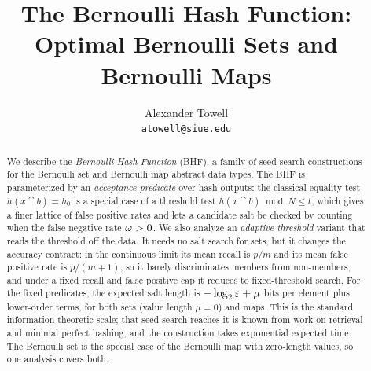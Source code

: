 \documentclass[final,11pt]{article}
\title{The Bernoulli Hash Function:\\Optimal Bernoulli Sets and Bernoulli Maps}
\author{
    Alexander Towell\\
    \texttt{atowell@siue.edu}
}
\date{}
\begin{document}
\maketitle

\begin{abstract}
We describe the \emph{Bernoulli Hash Function} (BHF), a family of seed-search
constructions for the Bernoulli set and Bernoulli map abstract data types.
The BHF is parameterized by an \emph{acceptance predicate} over hash outputs:
the classical equality test $h(x \cat b) = h_0$ is a special case of a
threshold test $h(x \cat b) \bmod N \leq t$, which gives a finer lattice of
false positive rates and lets a candidate salt be checked by counting when
the false negative rate $\omega > 0$.
We also analyze an \emph{adaptive threshold} variant that reads the threshold
off the data.
It needs no salt search for sets, but it changes the accuracy contract: in the
continuous limit its mean recall is $p/m$ and its mean false positive rate is
$p/(m+1)$, so it barely discriminates members from non-members, and under a
fixed recall and false positive cap it reduces to fixed-threshold search.
For the fixed predicates, the expected salt length is
$-\log_2 \varepsilon + \mu$ bits per element plus lower-order terms, for both sets
(value length $\mu = 0$) and maps.
This is the standard information-theoretic scale; that seed search reaches it
is known from work on retrieval and minimal perfect hashing, and the
construction takes exponential expected time.
The Bernoulli set is the special case of the Bernoulli map with zero-length
values, so one analysis covers both.
\end{abstract}



\tableofcontents
{}














\end{document}
